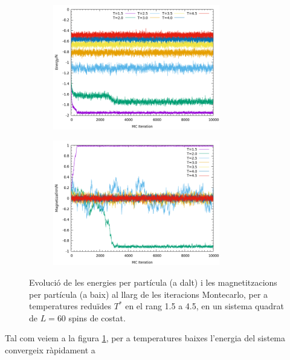 \documentclass[a4paper]{article}
\begin{document}
\begin{figure}[H]
    \centering
    \begin{subfigure}{.8\textwidth}
        \centering
        \includegraphics[width=0.8\textwidth]{SIM-L-060-energy-EVO.png}
        \label{evo_ene}
    \end{subfigure}
    \begin{subfigure}{.8\textwidth}
        \centering
        \includegraphics[width=0.8\textwidth]{SIM-L-060-magnetiz-EVO.png}
        \label{evo_mag}
    \end{subfigure}
    \caption{Evolució de les energies per partícula (a dalt) i les magnetitzacions per partícula (a baix) al llarg de les iteracions Montecarlo, per a temperatures reduïdes $T^*$ en el rang 1.5 a 4.5, en un sistema quadrat de $L=60$ spins de costat.}
\label{evo}
\end{figure}

Tal com veiem a la figura \ref{evo_ene}, per a temperatures baixes l'energia  del sistema convergeix ràpidament a 
\end{document}
